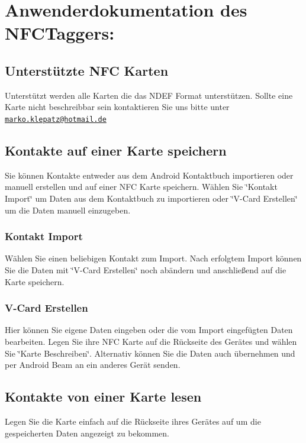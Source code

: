 \documentclass[a4paper,ngerman,12pt]{report}
\begin{document}
\chapter{Anwenderdokumentation des NFCTaggers:}
\section{Unterstützte NFC Karten}

Unterstützt werden alle Karten die das NDEF Format unterstützen. Sollte eine Karte nicht beschreibbar sein kontaktieren Sie uns bitte unter \href{mailto:markoklepatz@hotmail.de}{\tt marko.klepatz@hotmail.de}

\section{Kontakte auf einer Karte speichern}

Sie können Kontakte entweder aus dem Android Kontaktbuch importieren oder manuell erstellen und auf einer NFC Karte speichern. Wählen Sie \char`\"{}Kontakt Import\char`\"{} um Daten aus dem Kontaktbuch zu importieren oder \char`\"{}V-Card Erstellen\char`\"{} um die Daten manuell einzugeben.

\subsection{Kontakt Import}

Wählen Sie einen beliebigen Kontakt zum Import. Nach erfolgtem Import können Sie die Daten mit \char`\"{}V-Card Erstellen\char`\"{} noch abändern und anschließend auf die Karte speichern.

\subsection{V-Card Erstellen}

Hier können Sie eigene Daten eingeben oder die vom Import eingefügten Daten bearbeiten. Legen Sie ihre NFC Karte auf die Rückseite des Gerätes und wählen Sie \char`\"{}Karte Beschreiben\char`\"{}. Alternativ können Sie die Daten auch übernehmen und per Android Beam an ein anderes Gerät senden.

\section{Kontakte von einer Karte lesen}

Legen Sie die Karte einfach auf die Rückseite ihres Gerätes auf um die gespeicherten Daten angezeigt zu bekommen. 
\end{document}
